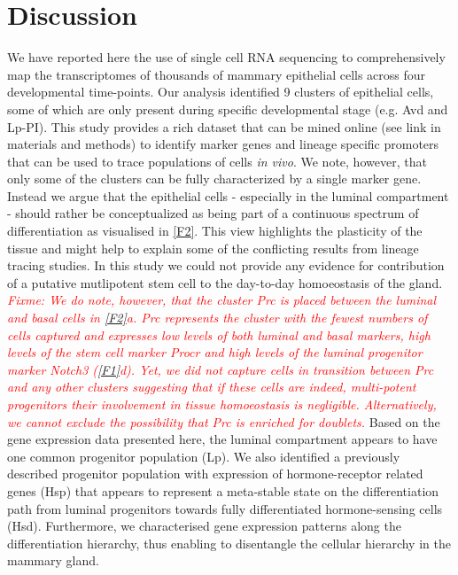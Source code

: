 \documentclass[titlepage, 12pt, oneside]{amsart}
\newcommand{\fixme}[1]{\textit{\textcolor{red}{Fixme: #1}}}
\begin{document}
\section{Discussion}

We have reported here the use of single cell RNA sequencing to comprehensively map the transcriptomes of thousands of mammary epithelial cells across four developmental time-points.
Our analysis identified 9 clusters of epithelial cells, some of which are only present during specific developmental stage (e.g. Avd and Lp-PI).
This study provides a rich dataset that can be mined online (see link in materials and methods) to identify marker genes and lineage specific promoters that can be used to trace populations of cells \textit{in vivo}.
We note, however, that only some of the clusters can be fully characterized by a single marker gene.
Instead we argue that the epithelial cells - especially in the luminal compartment - should rather be conceptualized as being part of a continuous spectrum of differentiation as visualised in \autoref{F2}.
This view highlights the plasticity of the tissue and might help to explain some of the conflicting results from lineage tracing studies\autocite{Inman2015}.
In this study we could not provide any evidence for contribution of a putative mutlipotent stem cell to the day-to-day homoeostasis of the gland.
\fixme{We do note, however, that the cluster Prc is placed between the luminal and basal cells in \autoref{F2}a.
Prc represents the cluster with the fewest numbers of cells captured and expresses low levels of both luminal and basal markers, high levels of the stem cell marker \textit{Procr}\autocite{Wang2015} and high levels of the luminal progenitor marker \textit{Notch3}\autocite{Lafkas2013} (\autoref{F1}d).
Yet, we did not capture cells in transition between Prc and any other clusters suggesting that if these cells are indeed, multi-potent progenitors their involvement in tissue homoeostasis is negligible.
Alternatively, we cannot exclude the possibility that Prc is enriched for doublets.}
Based on the gene expression data presented here, the luminal compartment appears to have one common progenitor population (Lp).
We also identified a previously described progenitor population with expression of hormone-receptor related genes (Hsp) that appears to represent a meta-stable state on the differentiation path from luminal progenitors towards fully differentiated hormone-sensing cells (Hsd).
Furthermore, we characterised gene expression patterns along the differentiation hierarchy, thus enabling to disentangle the cellular hierarchy in the mammary gland.
\end{document}
